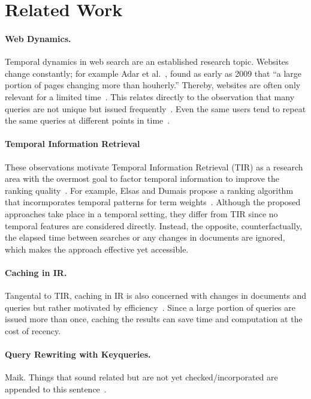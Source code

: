 \section{Related Work}
\paragraph{Web Dynamics.} %
Temporal dynamics in web search are an established research topic. Websites change constantly; for example Adar et al.~\cite{DBLP:conf/wsdm/AdarTDE09}, found as early as 2009 that ``a large portion of pages changing more than houherly.'' Thereby, websites are often only relevant for a limited time~\cite{DBLP:conf/sigir/TikhonovBBOKG13}. This relates directly to the observation that many queries are not unique but issued frequently~\cite{DBLP:conf/sigir/Dumais14,DBLP:journals/sigir/SilversteinHMM99}. Even the same users tend to repeat the same queries at different points in time~\cite{DBLP:conf/wsdm/TylerT10}.

\paragraph{Temporal Information Retrieval}
These observations motivate Temporal Information Retrieval (TIR) as a research area with the overmost goal to factor temporal information to improve the ranking quality~\cite{DBLP:journals/ftir/KanhabuaBN15,DBLP:journals/csur/CamposDJJ14}. For example, Elsas and Dumais propose a ranking algorithm that incormporates temporal patterns for term weights~\cite{DBLP:conf/wsdm/ElsasD10}. Although the proposed approaches take place in a temporal setting, they differ from TIR since no temporal features are considered directly. Instead, the opposite, counterfactually, the elapsed time between searches or any changes in documents are ignored, which makes the approach effective yet accessible.

\paragraph{Caching in IR.}
Tangental to TIR, caching in IR is also concerned with changes in documents and queries but rather motivated by efficiency~\cite{DBLP:conf/www/CambazogluJPBCLB10,DBLP:conf/sigir/Baeza-YatesGJMPS07}. Since a large portion of queries are issued more than once, caching the results can save time and computation at the cost of recency.


\paragraph{Query Rewriting with Keyqueries.} {\color{red} Maik.}
Things that sound related but are not yet checked/incorporated are appended to this sentence~\cite{li:2022}.

